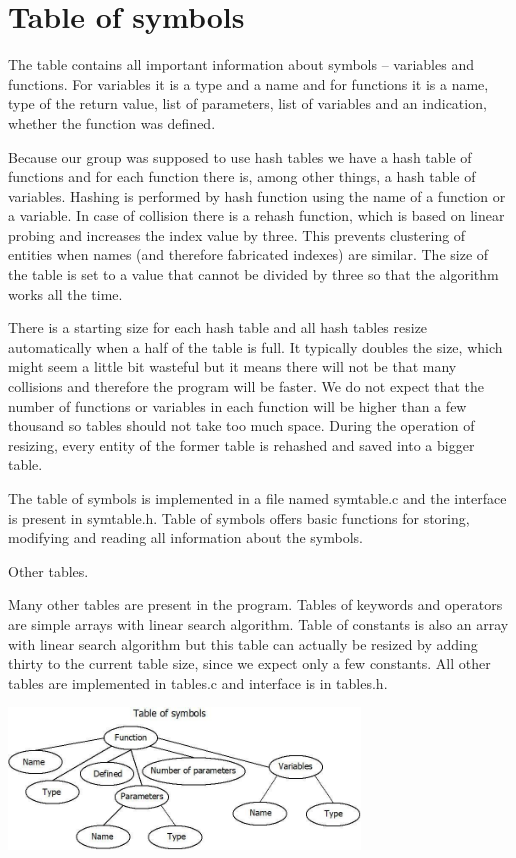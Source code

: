 \documentclass[10pt,a4paper,titlepage]{article}
\begin{document}
\section{Table of symbols}
\begin{justify}
  The table contains all important information about symbols – variables and
functions. For variables it is a type and a name and for functions it is a name,
type of the return value, list of parameters, list of variables and an
indication, whether the function was defined.

Because our group was supposed to use hash tables we have a hash table of
functions and for each function there is, among other things, a hash table of
variables. Hashing is performed by hash function using the name of a function
or a variable. In case of collision there is a rehash function, which is based
on linear probing and increases the index value by three. This prevents
clustering of entities when names (and therefore fabricated indexes) are
similar. The size of the table is set to a value that cannot be divided by
three so that the algorithm works all the time.

There is a starting size for each hash table and all hash tables resize
automatically when a half of the table is full. It typically doubles the size,
which might seem a little bit wasteful but it means there will not be that many
collisions and therefore the program will be faster. We do not expect that the
number of functions or variables in each function will be higher than a few
thousand so tables should not take too much space. During the operation of
resizing, every entity of the former table is rehashed and saved into a bigger
table.

The table of symbols is implemented in a file named symtable.c and the
interface is present in symtable.h. Table of symbols offers basic functions
for storing, modifying and reading all information about the symbols.


Other tables.

Many other tables are present in the program. Tables of keywords and operators
are simple arrays with linear search algorithm. Table of constants is also an
array with linear search algorithm but this table can actually be resized by
adding thirty to the current table size, since we expect only a few constants.
All other tables are implemented in tables.c and interface is in tables.h.
\end{justify}

\begin{center}
  \includegraphics[width=0.7\textwidth]{img/TableOfSymbols.jpg}
\end{center}
\end{document}
